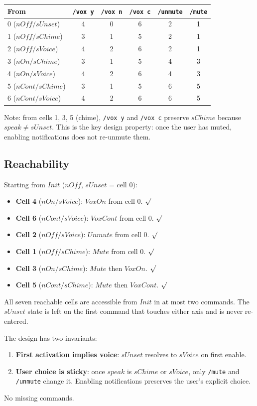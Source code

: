 \documentclass[a4paper,10pt,fleqn]{article}
\newcommand{\ok}{$\surd$}
\begin{document}
\begin{center}
  \begin{tabular}{l|c|c|c|c|c}
    \textbf{From} & \texttt{/vox y} & \texttt{/vox n} & \texttt{/vox c} & \texttt{/unmute} & \texttt{/mute} \\
    \hline
    0 ($nOff/sUnset$)  & 4 & 0 & 6 & 2 & 1 \\
    1 ($nOff/sChime$)  & 3 & 1 & 5 & 2 & 1 \\
    2 ($nOff/sVoice$)  & 4 & 2 & 6 & 2 & 1 \\
    3 ($nOn/sChime$)   & 3 & 1 & 5 & 4 & 3 \\
    4 ($nOn/sVoice$)   & 4 & 2 & 6 & 4 & 3 \\
    5 ($nCont/sChime$) & 3 & 1 & 5 & 6 & 5 \\
    6 ($nCont/sVoice$) & 4 & 2 & 6 & 6 & 5 \\
  \end{tabular}
\end{center}

Note: from cells 1, 3, 5 (chime), \texttt{/vox y} and \texttt{/vox c}
preserve $sChime$ because $speak \neq sUnset$. This is the key
design property: once the user has muted, enabling notifications
does not re-unmute them.

\subsection{Reachability}

Starting from $Init$ ($nOff$, $sUnset$ = cell 0):

\begin{itemize}
  \item \textbf{Cell 4} ($nOn/sVoice$): $VoxOn$ from cell 0. \ok{}
  \item \textbf{Cell 6} ($nCont/sVoice$): $VoxCont$ from cell 0. \ok{}
  \item \textbf{Cell 2} ($nOff/sVoice$): $Unmute$ from cell 0. \ok{}
  \item \textbf{Cell 1} ($nOff/sChime$): $Mute$ from cell 0. \ok{}
  \item \textbf{Cell 3} ($nOn/sChime$): $Mute$ then $VoxOn$. \ok{}
  \item \textbf{Cell 5} ($nCont/sChime$): $Mute$ then $VoxCont$. \ok{}
\end{itemize}

All seven reachable cells are accessible from $Init$ in at most
two commands. The $sUnset$ state is left on the first command
that touches either axis and is never re-entered.

The design has two invariants:
\begin{enumerate}
  \item \textbf{First activation implies voice}: $sUnset$ resolves
    to $sVoice$ on first enable.
  \item \textbf{User choice is sticky}: once $speak$ is $sChime$ or
    $sVoice$, only \texttt{/mute} and \texttt{/unmute} change it.
    Enabling notifications preserves the user's explicit choice.
\end{enumerate}

No missing commands.
\end{document}
